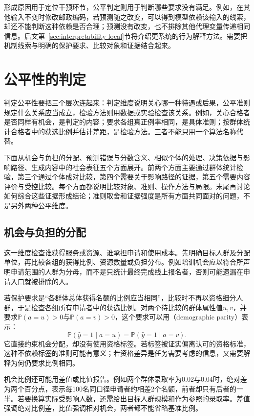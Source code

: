 形成原因用于定位干预环节，公平判定则用于判断哪些要求没有满足。例如，在其他输入不变时修改邮政编码，若预测随之改变，可以得到模型依赖该输入的线索，却还不能判断这种依赖是否合理；预测没有改变，也不排除其他代理变量传递相同信息。后文第~\ref{sec:interpretability-local}节将介绍更系统的行为解释方法。需要把机制线索与明确的保护要求、比较对象和证据结合起来。

\section{公平性的判定}
\label{sec:fairness-criteria}

判定公平性要把三个层次连起来：判定维度说明关心哪一种待遇或后果，公平准则规定什么关系应当成立，检验方法则用数据或实验检查该关系。例如，关心合格者是否同样有机会，是判定的内容；要求各组真正例率相同，是具体准则；按群体统计合格者中的获选比例并估计差距，是检验方法。三者不能只用一个算法名称代替。

下面从机会与负担的分配、预测错误与分数含义、相似个体的处理、决策依据与影响路径、生成内容中的社会表征五个方面展开。前两个方面主要通过群体统计检验，第三个通过个体成对比较，第四个需要关于影响路径的证据，第五个需要内容评价与受控比较。每个方面都说明比较对象、准则、操作方法与局限。末尾再讨论如何综合这些证据形成结论；准则取舍和证据强度是所有方面共同面对的问题，不是另外两种公平维度。

\subsection{机会与负担的分配}
\label{sec:fairness-group-comparison}

这一维度检查谁获得服务或资源、谁承担申请和使用成本。先明确目标人群及分配单位，再比较各组的获得比例、资源数量或负担分布。例如培训机会应以符合所声明申请范围的人群为分母，而不是只统计最终完成线上报名者，否则可能遗漏在申请入口就被排除的人。

若保护要求是“各群体总体获得名额的比例应当相同”，比较时不再以资格细分人群，于是检查各组所有申请者中的获选比例。对两个待比较的群体属性值$u,v$，并要求$\mathbb P(a=u)>0$与$\mathbb P(a=v)>0$，这个要求可以用（demographic parity）表示：
\[
 \mathbb P(\hat y=1\mid a=u)
 =\mathbb P(\hat y=1\mid a=v).
\]
它直接约束机会分配，却没有使用资格标签。若标签被证实偏离认可的资格标准，这种不依赖标签的准则可能有意义；若资格差异是任务需要考虑的信息，又需要解释为何仍要求比例相同。

机会比例还可能用差值或比值报告。例如两个群体录取率为$0.02$与$0.04$时，绝对差为两个百分点，表示每100名同口径申请者约相差2个名额，前者却只有后者的一半。若要换算实际受影响人数，还需给出目标人群规模和作为参照的录取率。差值强调绝对比例差，比值强调相对机会，两者都不能省略基准比例。

